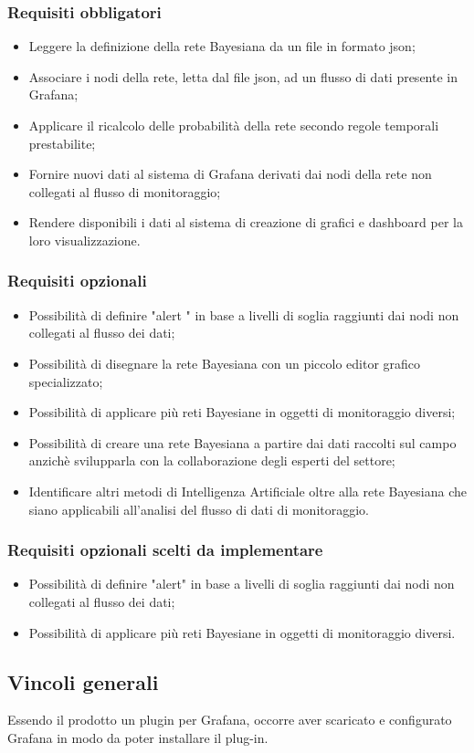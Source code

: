 				\subsubsection{Requisiti obbligatori}
				\begin{itemize}
					\item Leggere la definizione della rete Bayesiana da un file in formato json;
					\item Associare i nodi della rete, letta dal file json, ad un flusso di dati presente in Grafana;
					\item Applicare il ricalcolo delle probabilità della rete secondo regole temporali prestabilite;
					\item Fornire nuovi dati al sistema di Grafana derivati dai nodi della rete non collegati al flusso di monitoraggio;
					\item Rendere disponibili i dati al sistema di creazione di grafici e dashboard per la loro visualizzazione.
		        \end{itemize}
				\subsubsection{Requisiti opzionali}
				\begin{itemize}
					\item Possibilità di definire "alert \pedice" in base a livelli di soglia raggiunti dai nodi non collegati al flusso dei dati;
					\item Possibilità di disegnare la rete Bayesiana con un piccolo editor grafico specializzato;
					\item Possibilità di applicare più reti Bayesiane in oggetti di monitoraggio diversi;
					\item Possibilità di creare una rete Bayesiana a partire dai dati raccolti sul campo anzichè svilupparla con la collaborazione degli esperti del settore;
					\item Identificare altri metodi di Intelligenza Artificiale oltre alla rete Bayesiana che siano applicabili all'analisi del flusso di dati di monitoraggio.
		        \end{itemize}
		        \subsubsection{Requisiti opzionali scelti da implementare}
				\begin{itemize}
					\item Possibilità di definire "alert" in base a livelli di soglia raggiunti dai nodi non collegati al flusso dei dati;
					\item Possibilità di applicare più reti Bayesiane in oggetti di monitoraggio diversi.
	        	\end{itemize}
				
				
		\subsection{Vincoli generali}			
Essendo il prodotto un plugin per Grafana, occorre aver scaricato e configurato Grafana in modo da poter installare il plug-in.


\newpage
